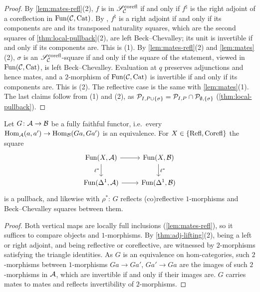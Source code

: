 \begin{proof}
%
By \cref{lem:mates-refl}(2), $f$ is in
$\mathscr{S}^{\mathrm{corefl}}_{\mathcal{C}}$
if and only if $f^{\natural}$ is the right adjoint of a coreflection in
$\operatorname{Fun}(\mathcal{C},\mathrm{Cat})$. By \cite[Cor.~5.2.12]{abellangagnahaugseng2024straightening},
$f^{\natural}$ is a right adjoint if and only if its components are and its
transposed naturality squares, which are the second squares of
\cref{thm:local-pullback}(2), are left Beck--Chevalley;
its unit is invertible if and only if its components are. This is (1).
By \cref{lem:mates-refl}(2) and \cref{lem:mates}(2), $\sigma$ is an
$\mathscr{S}^{\mathrm{corefl}}_{\mathcal{C}}$-square
if and only if the square of the statement, viewed in $\operatorname{Fun}(\mathcal{C},\mathrm{Cat})$,
is left Beck--Chevalley. Evaluation at $q$ preserves adjunctions and hence
mates, and a $2$-morphism of $\operatorname{Fun}(\mathcal{C},\mathrm{Cat})$ is invertible if and only if its
components are. This is (2). The reflective case is the same with
\cref{lem:mates}(1).
The last claims follow from (1) and (2), as
$\mathcal{P}_{I,P \cup \{\sigma\}} = \mathcal{P}_{I,P} \cap \mathcal{P}_{\emptyset,\{\sigma\}}$
(\cref{thm:local-pullback}).
\end{proof}

\begin{lem}
\label{lem:ff-reflects}
%
Let $G\colon \mathcal{A} \to \mathcal{B}$ be a fully faithful functor, i.e.\ every
$\operatorname{Hom}_{\mathcal{A}}(a,a') \to \operatorname{Hom}_{\mathcal{B}}(Ga,Ga')$
is an equivalence. For
$X \in \{\mathrm{Refl},\mathrm{Corefl}\}$
the square
\begin{equation*}
\begin{tikzcd}
\func(X,\A) \ar[r] \ar[d, "\ell^{*}"'] & \func(X,\B) \ar[d, "\ell^{*}"] \\
\func(\Delta^{1},\A) \ar[r] & \func(\Delta^{1},\B)
\end{tikzcd}
\end{equation*}
is a pullback, and likewise with $\rho^{*}$:
$G$ reflects (co)reflective $1$-morphisms and Beck--Chevalley squares between
them.
\end{lem}

\begin{proof}
%
Both vertical maps are locally full inclusions (\cref{lem:mates-refl}),
so it suffices to compare objects and $1$-morphisms.
By \cref{thm:adj-lifting}(2), being a left or right adjoint, and being
reflective or coreflective, are witnessed by $2$-morphisms satisfying the
triangle identities.
As $G$ is an equivalence on hom-categories, such $2$-morphisms between
$1$-morphisms $Ga \to Ga'$, $Ga' \to Ga$ are the images of such $2$-morphisms in
$\mathcal{A}$, which are invertible if and only if their images are.
$G$ carries mates to mates and reflects invertibility of $2$-morphisms.
\end{proof}

